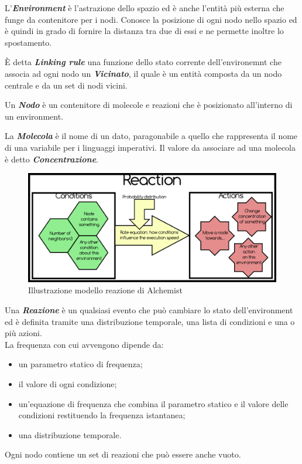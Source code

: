 \documentclass[12pt,a4paper,openright,twoside]{report}
\begin{document}
L'\textbf{\textit{Environment}} \`e l'astrazione dello spazio ed \`e anche l'entit\`a pi\`u esterna che funge da contenitore per i nodi. Conosce la posizione di ogni nodo nello spazio ed \`e quindi in grado di fornire la distanza tra due di essi e ne permette inoltre lo spostamento.

\`E detta \textbf{\textit{Linking rule}} una funzione dello stato corrente dell'environemnt che associa ad ogni nodo un \textbf{\textit{Vicinato}}, il quale \`e un entit\`a composta da un nodo centrale e da un set di nodi vicini.

Un \textbf{\textit{Nodo}} \`e un contenitore di molecole e reazioni che \`e posizionato all'interno di un environment.

La \textbf{\textit{Molecola}} \`e il nome di un dato, paragonabile a quello che rappresenta il nome di una variabile per i linguaggi imperativi.
Il valore da associare ad una molecola \`e detto \textbf{\textit{Concentrazione}}.

\begin{figure}[h] %
\begin{center} %
\includegraphics[width=14cm]{images/reaction.png} %
\caption[Illustrazione modello reazione di Alchemist]{Illustrazione modello reazione di Alchemist} \label{fig:alchemistReaction}
\end{center}
\end{figure}

Una \textbf{\textit{Reazione}} \`e un qualsiasi evento che pu\`o cambiare lo stato dell'environment ed \`e definita tramite una distribuzione temporale, una lista di condizioni e una o pi\`u azioni.
\\La frequenza con cui avvengono dipende da:
\begin{itemize}
\item un parametro statico di frequenza;
\item il valore di ogni condizione;
\item un'equazione di frequenza che combina il parametro statico e il valore delle condizioni restituendo la frequenza istantanea;
\item una distribuzione temporale.
\end{itemize}
Ogni nodo contiene un set di reazioni che pu\`o essere anche vuoto.
\end{document}
